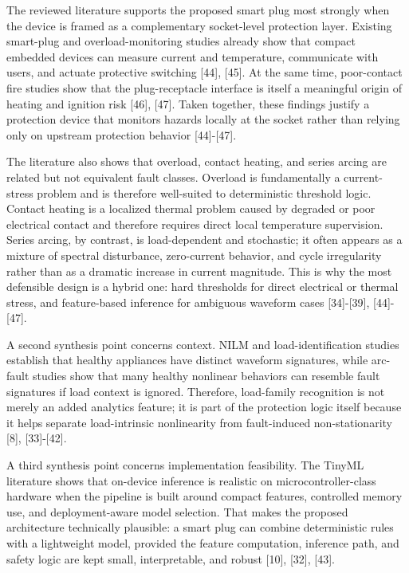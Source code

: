 The reviewed literature supports the proposed smart plug most strongly
when the device is framed as a complementary socket-level protection
layer. Existing smart-plug and overload-monitoring studies already show
that compact embedded devices can measure current and temperature,
communicate with users, and actuate protective switching {[}44{]},
{[}45{]}. At the same time, poor-contact fire studies show that the
plug-receptacle interface is itself a meaningful origin of heating and
ignition risk {[}46{]}, {[}47{]}. Taken together, these findings justify
a protection device that monitors hazards locally at the socket rather
than relying only on upstream protection behavior {[}44{]}-{[}47{]}.

The literature also shows that overload, contact heating, and series
arcing are related but not equivalent fault classes. Overload is
fundamentally a current-stress problem and is therefore well-suited to
deterministic threshold logic. Contact heating is a localized thermal
problem caused by degraded or poor electrical contact and therefore
requires direct local temperature supervision. Series arcing, by
contrast, is load-dependent and stochastic; it often appears as a
mixture of spectral disturbance, zero-current behavior, and cycle
irregularity rather than as a dramatic increase in current magnitude.
This is why the most defensible design is a hybrid one: hard thresholds
for direct electrical or thermal stress, and feature-based inference for
ambiguous waveform cases {[}34{]}-{[}39{]}, {[}44{]}-{[}47{]}.

A second synthesis point concerns context. NILM and load-identification
studies establish that healthy appliances have distinct waveform
signatures, while arc-fault studies show that many healthy nonlinear
behaviors can resemble fault signatures if load context is ignored.
Therefore, load-family recognition is not merely an added analytics
feature; it is part of the protection logic itself because it helps
separate load-intrinsic nonlinearity from fault-induced non-stationarity
{[}8{]}, {[}33{]}-{[}42{]}.

A third synthesis point concerns implementation feasibility. The TinyML
literature shows that on-device inference is realistic on
microcontroller-class hardware when the pipeline is built around compact
features, controlled memory use, and deployment-aware model selection.
That makes the proposed architecture technically plausible: a smart plug
can combine deterministic rules with a lightweight model, provided the
feature computation, inference path, and safety logic are kept small,
interpretable, and robust {[}10{]}, {[}32{]}, {[}43{]}.

